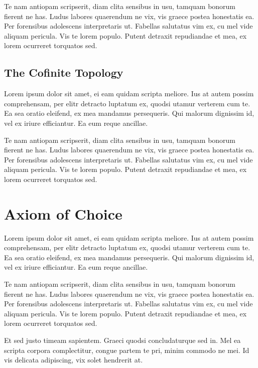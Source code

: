 \documentclass[12pt, a4paper]{article}
\theoremstyle{definition}
\theoremstyle{remark}
\numberwithin{equation}{section}
\numberwithin{figure}{section}
\numberwithin{table}{section}
\begin{document}
            Te nam antiopam scripserit, diam clita sensibus in usu, tamquam bonorum fierent ne has. Ludus labores quaerendum ne vix, vis graece postea honestatis ea. Per forensibus adolescens interpretaris ut. Fabellas salutatus vim ex, cu mel vide aliquam pericula. Vis te lorem populo. Putent detraxit repudiandae et mea, ex lorem ocurreret torquatos sed.
        \subsection{The Cofinite Topology}
            Lorem ipsum dolor sit amet, ei eam quidam scripta meliore. Ius at autem possim comprehensam, per elitr detracto luptatum ex, quodsi utamur verterem cum te. Ea sea oratio eleifend, ex mea mandamus persequeris. Qui malorum dignissim id, vel ex iriure efficiantur. Ea eum reque ancillae.

            Te nam antiopam scripserit, diam clita sensibus in usu, tamquam bonorum fierent ne has. Ludus labores quaerendum ne vix, vis graece postea honestatis ea. Per forensibus adolescens interpretaris ut. Fabellas salutatus vim ex, cu mel vide aliquam pericula. Vis te lorem populo. Putent detraxit repudiandae et mea, ex lorem ocurreret torquatos sed.

    \newpage
    
    

    \newpage
    \appendix
    \section{Axiom of Choice}
        Lorem ipsum dolor sit amet, ei eam quidam scripta meliore. Ius at autem possim comprehensam, per elitr detracto luptatum ex, quodsi utamur verterem cum te. Ea sea oratio eleifend, ex mea mandamus persequeris. Qui malorum dignissim id, vel ex iriure efficiantur. Ea eum reque ancillae.

        Te nam antiopam scripserit, diam clita sensibus in usu, tamquam bonorum fierent ne has. Ludus labores quaerendum ne vix, vis graece postea honestatis ea. Per forensibus adolescens interpretaris ut. Fabellas salutatus vim ex, cu mel vide aliquam pericula. Vis te lorem populo. Putent detraxit repudiandae et mea, ex lorem ocurreret torquatos sed.

        Et sed justo timeam sapientem. Graeci quodsi concludaturque sed in. Mel ea scripta corpora complectitur, congue partem te pri, minim commodo ne mei. Id vis delicata adipiscing, vix solet hendrerit at.
\end{document}
